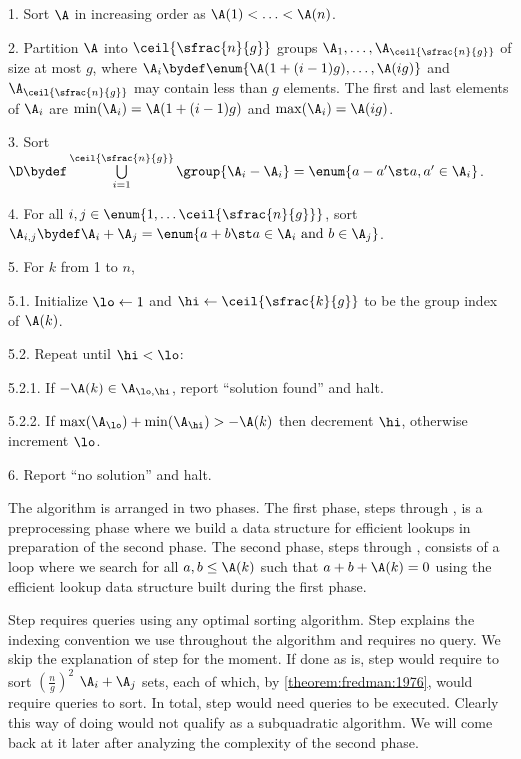 \begin{algorithm}

\item[1.] Sort $\A$ in increasing order as $\A(1) < \ldots < \A(n)$.

\item[2.] Partition $\A$ into $\ceil{\sfrac{n}{g}}$ groups $\A_1, \ldots,
\A_{\ceil{\sfrac{n}{g}}}$ of size at most $g$, where $\A_i \bydef \enum{\A(1 + (i-1)g),
\ldots, \A(ig)}$ and $\A_{\ceil{\sfrac{n}{g}}}$ may contain less than $g$ elements.
The first and last elements of $\A_i$ are $\min(\A_i) = \A(1 + (i-1)g)$ and
$\max(\A_i) = \A(ig)$.

\item[3.] Sort $\D \bydef \bigcup\limits_{i = 1}^{\ceil{\sfrac{n}{g}}}
\group{\A_i-\A_i} = \enum{a - a' \st a, a' \in \A_i}$.

\item[4.] For all $i,j \in \enum{1, \ldots \ceil{\sfrac{n}{g}}}$, sort $\A_{i,j}
\bydef \A_i + \A_j = \enum{a + b \st a \in \A_i \text{ and } b \in \A_j}$.

\item[5.] For $k$ from 1 to $n$,

\item[5.1.] Initialize $\lo \gets 1$ and $\hi \gets \ceil{\sfrac{k}{g}}$ to be
the group index of $\A(k)$.

\item[5.2.] Repeat until $\hi < \lo$:

\item[5.2.1.] If $-\A(k) \in \A_{\lo,\hi}$, report ``solution found'' and halt.

\item[5.2.2.] If $\max(\A_{\lo}) + \min(\A_{\hi}) > -\A(k)$ then decrement
$\hi$, otherwise increment $\lo$.

\item[6.] Report ``no solution'' and halt.

\end{algorithm}

The algorithm is arranged in two phases. The first phase, steps 
through , is a preprocessing phase where we build a data structure
for efficient lookups in preparation of the second phase. The second phase, steps
 through , consists of a loop where we search
for all $a, b \le \A(k)$ such that $a + b + \A(k) = 0$ using the efficient lookup
data structure built during the first phase.

Step  requires  queries using any optimal sorting
algorithm. Step  explains
the indexing convention we use throughout the algorithm and requires no query.
We skip the explanation of step  for the moment. If done as is,
step  would require to sort $(\frac{n}{g})^2$ $\A_i + \A_j$ sets,
each of which, by \ref{theorem:fredman:1976}, would require  queries
to sort. In total, step  would need  queries to be
executed. Clearly this way of doing would not qualify as a subquadratic
algorithm. We will come back at it later after analyzing the complexity of the
second phase.

